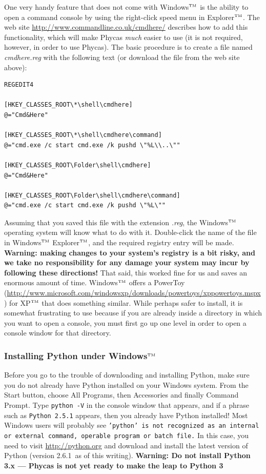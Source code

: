 \documentclass[10pt]{article}
\newcommand{\currPyVersion}{2.6.1}
\newcommand{\trademark}[1]{#1${}^{\mbox{\tiny TM}}$}
\newcommand{\pathname}[1]{{\em #1}}				%
\newcommand{\menu}[1]{{\sf #1}}					%
\newcommand{\code}[1]{{\tt #1}}					%
\newcommand{\warning}[1]{{\bf Warning: #1}}		%
\newcommand{\warnNoPyThree}{\warning{Do not install Python 3.x --- Phycas is not yet ready to make the leap to Python 3}}
\begin{document}
One very handy feature that does not come with \trademark{Windows} is the ability to open a command console by using the right-click speed menu in \trademark{Explorer}. The web site \url{http://www.commandline.co.uk/cmdhere/} describes how to add this functionality, which will make Phycas {\em much} easier to use (it is not required, however, in order to use Phycas). The basic procedure is to create a file named \pathname{cmdhere.reg} with the following text (or download the file from the web site above):
%
\begin{verbatim}
REGEDIT4

[HKEY_CLASSES_ROOT\*\shell\cmdhere]
@="Cmd&Here"

[HKEY_CLASSES_ROOT\*\shell\cmdhere\command]
@="cmd.exe /c start cmd.exe /k pushd \"%L\\..\""

[HKEY_CLASSES_ROOT\Folder\shell\cmdhere]
@="Cmd&Here"

[HKEY_CLASSES_ROOT\Folder\shell\cmdhere\command]
@="cmd.exe /c start cmd.exe /k pushd \"%L\""
\end{verbatim}
%
Assuming that you saved this file with the extension \pathname{.reg}, the \trademark{Windows} operating system will know what to do with it. Double-click the name of the file in \trademark{Windows} \trademark{Explorer}, and the required registry entry will be made. \warning{making changes to your system's registry is a bit risky, and we take no responsibility for any damage your system may incur by following these directions!} That said, this worked fine for us and saves an enormous amount of time. \trademark{Windows} offers a PowerToy (\url{http://www.microsoft.com/windowsxp/downloads/powertoys/xppowertoys.mspx}) for \trademark{XP} that does something similar. While perhaps safer to install, it is somewhat frustrating to use because if you are already inside a directory in which you want to open a console, you must first go up one level in order to open a console window for that directory.

\subsubsection{Installing Python under \trademark{Windows}}

Before you go to the trouble of downloading and installing Python, make sure you do not already have Python installed on your Windows system. From the Start button, choose \menu{All Programs}, then \menu{Accessories} and finally \menu{Command Prompt}. Type \code{python -V} in the console window that appears, and if a phrase such as \code{Python 2.5.1} appears, then you already have Python installed! Most Windows users will probably see \code{'python' is not recognized as an internal or external command, operable program or batch file.} In this case, you need to visit \url{http://python.org} and download and install the latest version of Python (version \currPyVersion\ as of this writing). \warnNoPyThree
\end{document}
